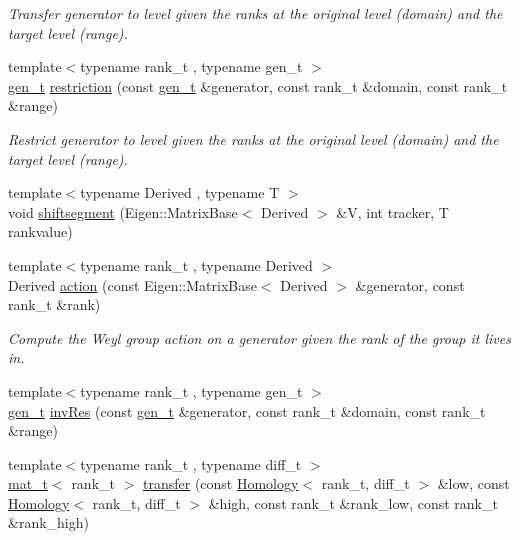 \begin{DoxyCompactItemize}
\begin{DoxyCompactList}\small\item\em Transfer generator to level given the ranks at the original level (domain) and the target level (range). \end{DoxyCompactList}\item 
{\footnotesize template$<$typename rank\+\_\+t , typename gen\+\_\+t $>$ }\\\hyperlink{namespaceMackey_a6bb0b2796632ba6c7f8ea192f7aecffe}{gen\+\_\+t} \hyperlink{namespaceMackey_ad1e907ff76b07d4fc4c9d4bdf25918bd}{restriction} (const \hyperlink{namespaceMackey_a6bb0b2796632ba6c7f8ea192f7aecffe}{gen\+\_\+t} \&generator, const rank\+\_\+t \&domain, const rank\+\_\+t \&range)
\begin{DoxyCompactList}\small\item\em Restrict generator to level given the ranks at the original level (domain) and the target level (range). \end{DoxyCompactList}\item 
{\footnotesize template$<$typename Derived , typename T $>$ }\\void \hyperlink{namespaceMackey_aab8a6292210a3b71960cb03b79d218e6}{shiftsegment} (Eigen\+::\+Matrix\+Base$<$ Derived $>$ \&V, int tracker, T rankvalue)
\item 
{\footnotesize template$<$typename rank\+\_\+t , typename Derived $>$ }\\Derived \hyperlink{namespaceMackey_aa515b26c0fbc7f19b36cee7d826f07b9}{action} (const Eigen\+::\+Matrix\+Base$<$ Derived $>$ \&generator, const rank\+\_\+t \&rank)
\begin{DoxyCompactList}\small\item\em Compute the Weyl group action on a generator given the rank of the group it lives in. \end{DoxyCompactList}\item 
{\footnotesize template$<$typename rank\+\_\+t , typename gen\+\_\+t $>$ }\\\hyperlink{namespaceMackey_a6bb0b2796632ba6c7f8ea192f7aecffe}{gen\+\_\+t} \hyperlink{namespaceMackey_a30b5667e411ff694aa989e95e394bb41}{inv\+Res} (const \hyperlink{namespaceMackey_a6bb0b2796632ba6c7f8ea192f7aecffe}{gen\+\_\+t} \&generator, const rank\+\_\+t \&domain, const rank\+\_\+t \&range)
\item 
{\footnotesize template$<$typename rank\+\_\+t , typename diff\+\_\+t $>$ }\\\hyperlink{namespaceMackey_a035386035757dade630f685e508e5cf9}{mat\+\_\+t}$<$ rank\+\_\+t $>$ \hyperlink{namespaceMackey_abd5b370902e8b53b32e3fd4e329f068d}{transfer} (const \hyperlink{classMackey_1_1Homology}{Homology}$<$ rank\+\_\+t, diff\+\_\+t $>$ \&low, const \hyperlink{classMackey_1_1Homology}{Homology}$<$ rank\+\_\+t, diff\+\_\+t $>$ \&high, const rank\+\_\+t \&rank\+\_\+low, const rank\+\_\+t \&rank\+\_\+high)

\end{DoxyCompactItemize}
